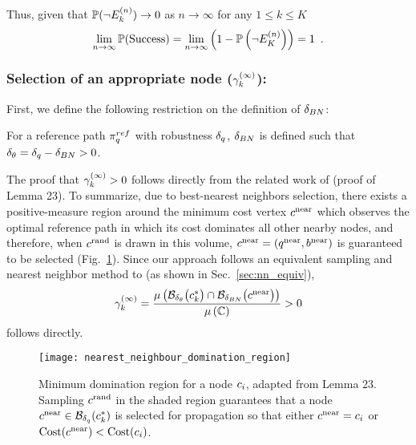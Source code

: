 Thus, given that $\mathbb{P}(\neg E^{(n)}_k) \rightarrow 0$ as $n \rightarrow \infty$ for any $1 \leq k \leq K$
\begin{equation}
    \lim_{n \rightarrow \infty} \mathbb{P}(\textrm{Success}) = \lim_{n \rightarrow \infty} \left( 1 - \mathbb{P}\left( \neg E^{(n)}_K \right) \right) = 1 \enspace.
\end{equation}



\subsubsection{Selection of an appropriate node ($\gamma_k^{(\infty)}$):}
\label{sec:select}

First, we define the following restriction on the definition of $\delta_{BN}$: 

\begin{definition}
\label{prop:bestnear_requirement}
    For a reference path $\pi_{q}^{ref}$ with robustness $\delta_q$, $\delta_{BN}$ is defined such that $\delta_\theta = \delta_q - \delta_{BN} > 0$.
\end{definition}

The proof that $\gamma_k^{(\infty)} > 0$ follows directly from the related work of \cite{LiAOKP2016} (proof of Lemma 23).  To summarize, due to best-nearest neighbors selection, there exists a positive-measure region around the minimum cost vertex $c^\textrm{near}$ which observes the optimal reference path in which its cost dominates all other nearby nodes, and therefore, when $c^\textrm{rand}$ is drawn in this volume, $c^\textrm{near} = (q^\textrm{near}, b^\textrm{near})$ is guaranteed to be selected (Fig.~\ref{fig:Yanbo_lemma_23_figure}).  Since our approach follows an equivalent sampling and nearest neighbor method to \cite{LiAOKP2016} (as shown in Sec.~\ref{sec:nn_equiv}), 
\begin{equation}
    \gamma_k^{(\infty)} = \frac{\mu\left( \mathcal{B}_{\delta_\theta}\big( c_k^* \big) \cap \mathcal{B}_{\delta_{BN}}\big( c^\textrm{near} \big) \right)}{\mu\left( \mathbb{C} \right)} > 0
\end{equation}
follows directly.

\begin{figure}[t]
    \centering
    \texttt{[image: nearest\_neighbour\_domination\_region]}
    \caption{Minimum domination region for a node $c_i$, adapted from \cite{LiAOKP2016} Lemma 23. Sampling $c^\textrm{rand}$ in the shaded region guarantees that a node $c^\textrm{near} \in \mathcal{B}_{\delta_q}(c_k^*)$ is selected for propagation so that either $c^\textrm{near} = c_i$ or $\textrm{Cost}(c^\textrm{near}) < \textrm{Cost}(c_i)$.}
    \label{fig:Yanbo_lemma_23_figure}
\end{figure}


